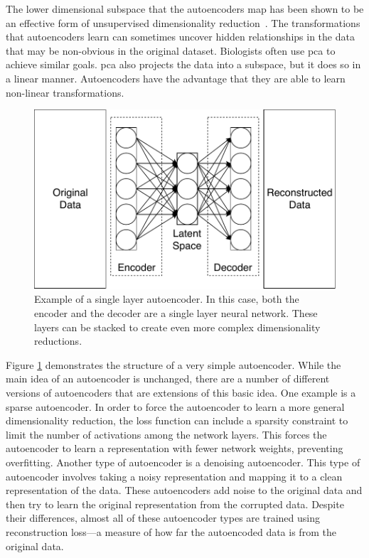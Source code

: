 The lower dimensional subspace that the autoencoders map has been shown to be an effective form of unsupervised dimensionality reduction~\cite{baldi2012autoencoders}.
The transformations that autoencoders learn can sometimes uncover hidden relationships in the data that may be non-obvious in the original dataset.
Biologists often use \gls{pca} to achieve similar goals.
\gls{pca} also projects the data into a subspace, but it does so in a linear manner.
Autoencoders have the advantage that they are able to learn non-linear transformations.

\begin{figure}[t!]
\begin{center}
\includegraphics{figs/Autoencoder.pdf}
\caption[Example of a single layer autoencoder]{Example of a single layer autoencoder.
In this case, both the encoder and the decoder are a single layer neural network.
These layers can be stacked to create even more complex dimensionality reductions.}
\end{center}
\label{fig:ae}
\end{figure}

Figure \ref{fig:ae} demonstrates the structure of a very simple autoencoder.
While the main idea of an autoencoder is unchanged, there are a number of different versions of autoencoders that are extensions of this basic idea.
One example is a sparse autoencoder.
In order to force the autoencoder to learn a more general dimensionality reduction, the loss function can include a sparsity constraint to limit the number of activations among the network layers.
This forces the autoencoder to learn a representation with fewer network weights, preventing overfitting.
Another type of autoencoder is a denoising autoencoder.
This type of autoencoder involves taking a noisy representation and mapping it to a clean representation of the data.
These autoencoders add noise to the original data and then try to learn the original representation from the corrupted data.
Despite their differences, almost all of these autoencoder types are trained using reconstruction loss---a measure of how far the autoencoded data is from the original data.

